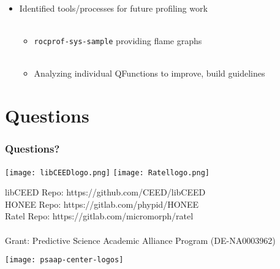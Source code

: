 \documentclass{beamer}
\begin{document}
\begin{frame}
\begin{center}
\begin{itemize}
\item Identified tools/processes for future profiling work\\

~\\

\begin{itemize}

\item \lstinline{rocprof-sys-sample} providing flame graphs\\

~\\

\item Analyzing individual QFunctions to improve, build guidelines\\

\end{itemize}

\end{itemize}

\end{center}
\end{frame}

\section{Questions}

\begin{frame}
\frametitle{Questions?}

\begin{center}
\texttt{[image: libCEEDlogo.png]}
\texttt{[image: Ratellogo.png]}
\end{center}

{\flushleft

libCEED Repo: https://github.com/CEED/libCEED\\
HONEE Repo: https://gitlab.com/phypid/HONEE\\
Ratel Repo: https://gitlab.com/micromorph/ratel\\

~\\

Grant: Predictive Science Academic Alliance Program (DE-NA0003962)\\

}

\begin{center}
\texttt{[image: psaap-center-logos]}
\end{center}

\end{frame}

\end{document}
